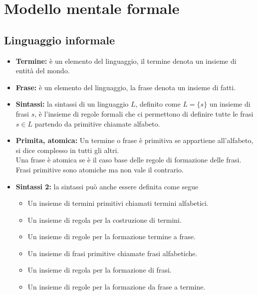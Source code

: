 \documentclass{book}
\begin{document}
    \chapter{Modello mentale formale}
    \section{Linguaggio informale}
    \begin{itemize}
        \item \textbf{Termine:} è un elemento del linguaggio, il termine denota un insieme di entità del mondo.
        \item \textbf{Frase:} è un elemento del linguaggio, la frase denota un insieme di fatti.
        \item \textbf{Sintassi:} la sintassi di un linguaggio $L$, definito come $L=\{s\}$ un insieme di frasi $s$, è l'insieme di regole formali che ci permettono di definire tutte le frasi $s \in L$ partendo da primitive chiamate alfabeto.
        \item \textbf{Primita, atomica:} Un termine o frase è primitiva se appartiene all'alfabeto, si dice complesso in tutti gli altri.\\
            Una frase è atomica se è il caso base delle regole di formazione delle frasi.\\
            Frasi primitive sono atomiche ma non vale il contrario.
        \item \textbf{Sintassi 2:} la sintassi può anche essere definita come segue
            \begin{itemize}
                \item Un insieme di termini primitivi chiamati termini alfabetici.
                \item Un insieme di regola per la costruzione di termini.
                \item Un insieme di regole per la formazione termine a frase.
                \item Un insieme di frasi primitive chiamate frasi alfabetiche.
                \item Un insieme di regola per la formazione di frasi.
                \item Un insieme di regole per la formazione da frase a termine.
            \end{itemize}
    \end{itemize}
\end{document}
